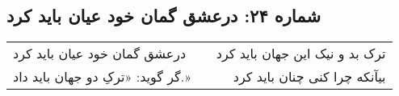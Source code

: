 \begin{center}
\section*{شماره ۲۴: درعشق گمان خود عیان باید کرد}
\label{sec:024}
\begin{longtable}{l p{0.5cm} r}
درعشق گمان خود عیان باید کرد
&&
ترک بد و نیک این جهان باید کرد
\\
گر گوید: «ترکِ دو جهان باید داد.»
&&
بیآنکه چرا کنی چنان باید کرد
\\
\end{longtable}
\end{center}
